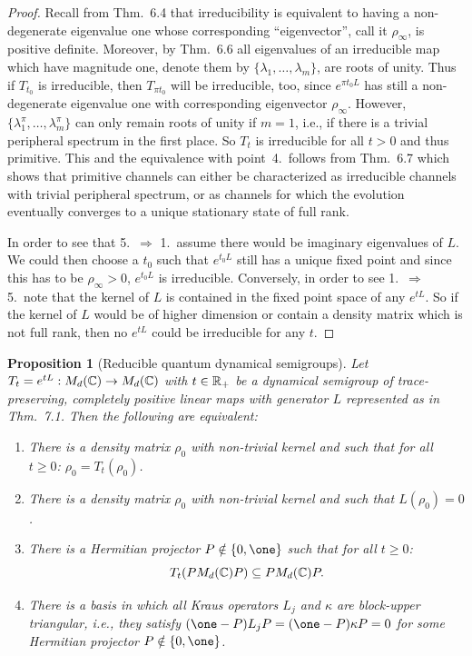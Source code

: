 \documentclass[11pt,a4paper]{article}
\theoremstyle{plain}
\newtheorem{proposition}{Proposition}
\begin{document}
\begin{proof}
    Recall from Thm.~6.4 that irreducibility is equivalent to having a non-degenerate eigenvalue one whose corresponding ``eigenvector'', call it $\rho_\infty$, is positive definite. Moreover, by Thm.~6.6 all eigenvalues of an irreducible map which have magnitude one, denote them by $\{\lambda_1,\ldots,\lambda_m\}$, are roots of unity. Thus if $T_{t_0}$ is irreducible, then $T_{\pi t_0}$ will be irreducible, too, since $e^{\pi t_0 L}$ has still a non-degenerate eigenvalue one with corresponding eigenvector $\rho_\infty$. However, $\{\lambda_1^{\pi},\ldots,\lambda_m^{\pi}\}$ can only remain roots of unity if $m=1$, i.e., if there is a trivial peripheral spectrum in the first place. So $T_t$ is irreducible for all $t>0$ and thus primitive. This and the equivalence with point~4.\ follows from Thm.~6.7 which shows that primitive channels can either be characterized as irreducible channels with trivial peripheral spectrum, or as channels for which the evolution eventually converges to a unique stationary state of full rank.

    In order to see that 5.\ $\Rightarrow$ 1.\ assume there would be imaginary eigenvalues of $L$. We could then choose a $t_0$ such that $e^{t_0L}$ still has a unique fixed point and since this has to be $\rho_\infty>0$, $e^{t_0L}$ is irreducible. Conversely, in order to see 1.\ $\Rightarrow$ 5.\ note that the kernel of $L$ is contained in the fixed point space of any $e^{tL}$. So if the kernel of $L$ would be of higher dimension or contain a density matrix which is not full rank, then no $e^{tL}$ could be irreducible for any $t$.
\end{proof}

\begin{proposition}[Reducible quantum dynamical semigroups]
    Let $T_t=e^{tL}:M_d(\mathbb{C})\to M_d(\mathbb{C})$ with $t\in\mathbb{R}_{+}$ be a dynamical semigroup of trace-preserving, completely positive linear maps with generator $L$ represented as in Thm.~7.1. Then the following are equivalent:
    \begin{enumerate}
        \item There is a density matrix $\rho_0$ with non-trivial kernel and such that for all $t\ge 0$: $\rho_0=T_t(\rho_0)$.
        \item There is a density matrix $\rho_0$ with non-trivial kernel and such that $L(\rho_0)=0$.
        \item There is a Hermitian projector $P\notin\{0,\one\}$ such that for all $t\ge 0$:
              \[
                  T_t(PM_d(\mathbb{C})P)\subseteq PM_d(\mathbb{C})P.
              \]
        \item There is a basis in which all Kraus operators $L_j$ and $\kappa$ are block-upper triangular, i.e., they satisfy $(\one-P)L_jP=(\one-P)\kappa P=0$ for some Hermitian projector $P\notin\{0,\one\}$.
    \end{enumerate}
\end{proposition}
\end{document}
